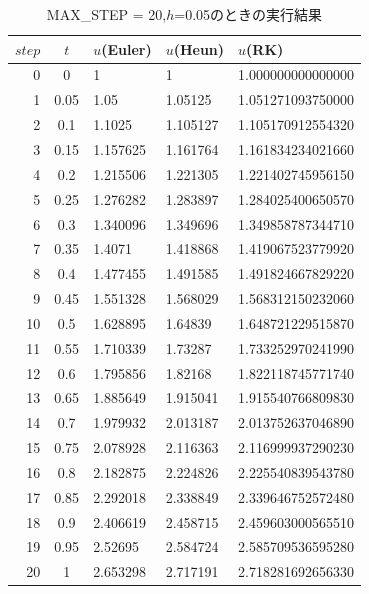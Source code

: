 \documentclass[dvipdfmx]{jarticle}
\begin{document}
    \begin{table}[H]
      \caption{MAX\_STEP = 20,$h$=0.05のときの実行結果}
    \label{h005}
    \begin{center}
        \begin{tabular}{r|c|l|l|l}\hline
          $step$ & $t$ & $u$(Euler) & $u$(Heun) & $u$(RK) \\ \hline \hline
          0 & 0 & 1 & 1 & 1.000000000000000 \\ 
          1 & 0.05 & 1.05 & 1.05125 & 1.051271093750000  \\ 
          2 & 0.1 & 1.1025 & 1.105127 & 1.105170912554320  \\ 
          3 & 0.15 & 1.157625 & 1.161764 & 1.161834234021660  \\ 
          4 & 0.2 & 1.215506 & 1.221305 & 1.221402745956150  \\ 
          5 & 0.25 & 1.276282 & 1.283897 & 1.284025400650570  \\ 
          6 & 0.3 & 1.340096 & 1.349696 & 1.349858787344710  \\ 
          7 & 0.35 & 1.4071 & 1.418868 & 1.419067523779920  \\ 
          8 & 0.4 & 1.477455 & 1.491585 & 1.491824667829220  \\ 
          9 & 0.45 & 1.551328 & 1.568029 & 1.568312150232060  \\ 
          10 & 0.5 & 1.628895 & 1.64839 & 1.648721229515870  \\ 
          11 & 0.55 & 1.710339 & 1.73287 & 1.733252970241990  \\ 
          12 & 0.6 & 1.795856 & 1.82168 & 1.822118745771740  \\ 
          13 & 0.65 & 1.885649 & 1.915041 & 1.915540766809830  \\ 
          14 & 0.7 & 1.979932 & 2.013187 & 2.013752637046890  \\ 
          15 & 0.75 & 2.078928 & 2.116363 & 2.116999937290230  \\ 
          16 & 0.8 & 2.182875 & 2.224826 & 2.225540839543780  \\ 
          17 & 0.85 & 2.292018 & 2.338849 & 2.339646752572480  \\ 
          18 & 0.9 & 2.406619 & 2.458715 & 2.459603000565510  \\ 
          19 & 0.95 & 2.52695 & 2.584724 & 2.585709536595280  \\ 
          20 & 1 & 2.653298 & 2.717191 & 2.718281692656330  \\ \hline
          
        \end{tabular}
    \end{center}
    \end{table}
\end{document}
